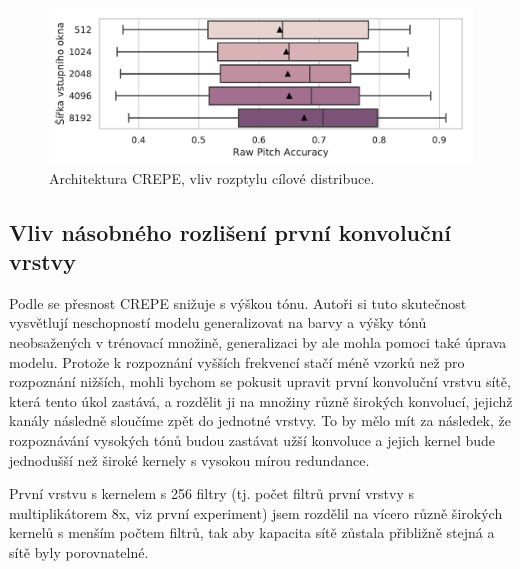 \begin{figure}[h]\centering
    \includegraphics[scale=0.6]{../img/figures/crepe_sirka.pdf}
\caption{Architektura CREPE, vliv rozptylu cílové distribuce.}\label{obr:crepe_sirka}
\end{figure}



\subsection{Vliv násobného rozlišení první konvoluční vrstvy}

Podle \cite{Kim2018} se přesnost CREPE snižuje s výškou tónu. Autoři si tuto skutečnost vysvětlují neschopností modelu generalizovat na barvy a výšky tónů neobsažených v trénovací množině, generalizaci by ale mohla pomoci také úprava modelu. Protože k rozpoznání vyšších frekvencí stačí méně vzorků než pro rozpoznání nižších, mohli bychom se pokusit upravit první konvoluční vrstvu sítě, která tento úkol zastává, a rozdělit ji na množiny různě širokých konvolucí, jejichž kanály následně sloučíme zpět do jednotné vrstvy. To by mělo mít za následek, že rozpoznávání vysokých tónů budou zastávat užší konvoluce a jejich kernel bude jednodušší než široké kernely s vysokou mírou redundance.

První vrstvu s kernelem s 256 filtry (tj. počet filtrů první vrstvy s multiplikátorem 8x, viz první experiment) jsem rozdělil na vícero různě širokých kernelů s menším počtem filtrů, tak aby kapacita sítě zůstala přibližně stejná a sítě byly porovnatelné. 

